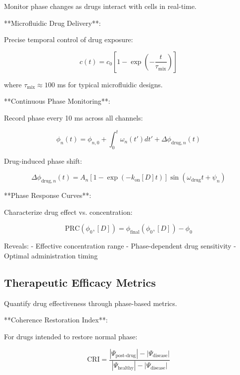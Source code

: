 \documentclass[12pt,a4paper]{report}
\begin{document}
Monitor phase changes as drugs interact with cells in real-time.

**Microfluidic Drug Delivery**:

Precise temporal control of drug exposure:

\begin{equation}
c(t) = c_0 \left[1 - \exp\left(-\frac{t}{\tau_{\text{mix}}}\right)\right]
\end{equation}

where $\tau_{\text{mix}} \approx 100$ ms for typical microfluidic designs.

**Continuous Phase Monitoring**:

Record phase every 10 ms across all channels:

\begin{equation}
\phi_n(t) = \phi_{n,0} + \int_0^t \omega_n(t') dt' + \Delta\phi_{\text{drug},n}(t)
\end{equation}

Drug-induced phase shift:

\begin{equation}
\Delta\phi_{\text{drug},n}(t) = A_n [1 - \exp(-k_{\text{on}}[D]t)] \sin(\omega_{\text{drug}}t + \psi_n)
\end{equation}

**Phase Response Curves**:

Characterize drug effect vs. concentration:

\begin{equation}
\text{PRC}(\phi_0, [D]) = \phi_{\text{final}}(\phi_0, [D]) - \phi_0
\end{equation}

Reveals:
- Effective concentration range
- Phase-dependent drug sensitivity
- Optimal administration timing

\subsection{Therapeutic Efficacy Metrics}

Quantify drug effectiveness through phase-based metrics.

**Coherence Restoration Index**:

For drugs intended to restore normal phase:

\begin{equation}
\text{CRI} = \frac{|\Psi_{\text{post-drug}}| - |\Psi_{\text{disease}}|}{|\Psi_{\text{healthy}}| - |\Psi_{\text{disease}}|}
\end{equation}
\end{document}
